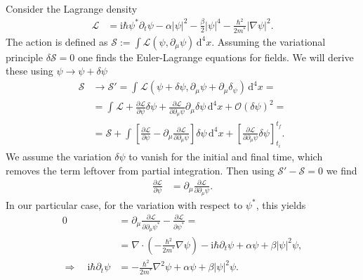\documentclass[english, parskip=full]{scrartcl}
\title{\titel}
\author{\autor}
\date{\today}
\newcommand{\intx}{}
\newcommand{\kla}{}
\newcommand{\klam}{}
\renewcommand{\i}{\text{i}}
\begin{document}
\maketitle  %

Consider the Lagrange density
\begin{align}
\mathcal{L} &= \i\hbar \psi^\ast \partial_t\psi - \alpha |\psi|^2 - \frac{\beta}{2} |\psi|^4 - \frac{\hbar^2}{2m^\ast} |\nabla\psi|^2.
\end{align}
The action is defined as $\mathcal{S} := \int \mathcal{L}(\psi, \partial_\mu\psi) \,\mathrm{d}^4x$.
Assuming the variational principle $\delta\mathcal{S} = 0$ one finds the Euler-Lagrange equations for fields.
We will derive these using $\psi \rightarrow \psi + \delta\psi$
\begin{align}
\mathcal{S} &\rightarrow \mathcal{S}' = \intx\int_{ }^{ } \mathcal{L}\kla\left( \psi + \delta\psi, \partial_\mu \psi + \partial_\mu \delta_\psi \right) \, \mathrm{d}^4x = \\
&= \intx\int_{ }^{ } \mathcal{L} + \frac{\partial \mathcal{L}}{\partial \psi} \delta\psi + \frac{\partial \mathcal{L}}{\partial \partial_\mu \psi} \partial_\mu \delta\psi \, \mathrm{d}^4x + \mathcal{O}(\delta\psi)^2 = \\
&= \mathcal{S} + \intx\int_{ }^{ } \klam\left[ \frac{\partial \mathcal{L}}{\partial \psi} - \partial_\mu \frac{\partial \mathcal{L}}{\partial \partial_\mu \psi}  \right] \delta\psi \, \mathrm{d}^4x + \klam\left[ \frac{\partial \mathcal{L}}{\partial \partial_\mu \psi} \delta\psi \right]_{t_i}^{t_f}.
\end{align}
We assume the variation $\delta\psi$ to vanish for the initial and final time, which removes the term leftover from partial integration.
Then using $\mathcal{S}' - \mathcal{S} = 0$ we find
\begin{align}
\frac{\partial \mathcal{L}}{\partial \psi} &= \partial_\mu \frac{\partial \mathcal{L}}{\partial \partial_\mu \psi}.
\end{align}
In our particular case, for the variation with respect to $\psi^\ast$, this yields
\begin{align}
0 &= \partial_\mu \frac{\partial \mathcal{L}}{\partial \partial_\mu \psi^\ast} - \frac{\partial \mathcal{L}}{\partial \psi^\ast} = \\
&= \nabla\cdot \kla\left( -\frac{\hbar^2}{2m^\ast} \nabla\psi \right) - \i\hbar\partial_t \psi + \alpha\psi + \beta|\psi|^2\psi,\\
\Rightarrow\quad \i\hbar\partial_t\psi &= -\frac{\hbar^2}{2m^\ast} \nabla^2\psi + \alpha\psi + \beta|\psi|^2 \psi.
\end{align}
\end{document}
